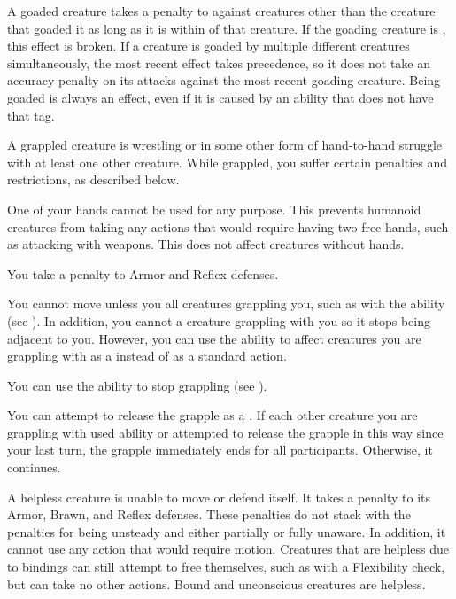    A goaded creature takes a  penalty to  against creatures other than the creature that goaded it as long as it is within \medrange of that creature.
  If the goading creature is , this effect is broken.
  If a creature is goaded by multiple different creatures simultaneously, the most recent effect takes precedence, so it does not take an accuracy penalty on its attacks against the most recent goading creature.
  Being goaded is always an  effect, even if it is caused by an ability that does not have that tag.

   A grappled creature is wrestling or in some other form of hand-to-hand struggle with at least one other creature.
  While grappled, you suffer certain penalties and restrictions, as described below.
  \begin{raggeditemize}
    \item One of your hands cannot be used for any purpose.
      This prevents humanoid creatures from taking any actions that would require having two free hands, such as attacking with  weapons.
      This does not affect creatures without hands.
    \item You take a  penalty to Armor and Reflex defenses.
    \item You cannot move unless you  all creatures grappling you, such as with the  ability (see ).
      In addition, you cannot  a creature grappling with you so it stops being adjacent to you.
      However, you can use the  ability to affect creatures you are grappling with as a  instead of as a standard action.
      \item You can use the  ability to stop grappling (see ).
      \item You can attempt to release the grapple as a . If each other creature you are grappling with used  ability or attempted to release the grapple in this way since your last turn, the grapple immediately ends for all participants. Otherwise, it continues.
  \end{raggeditemize}

   A helpless creature is unable to move or defend itself.
  It takes a  penalty to its Armor, Brawn, and Reflex defenses.
  These penalties do not stack with the penalties for being unsteady and either partially or fully unaware.
  In addition, it cannot use any action that would require motion.
  Creatures that are helpless due to bindings can still attempt to free themselves, such as with a Flexibility check, but can take no other actions.
  Bound and unconscious creatures are helpless.

